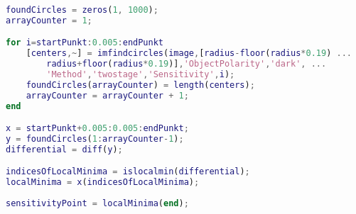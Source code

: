 \begin{lstlisting}[language=MATLAB, caption=Arbeitspunktsuche, label=lst:arbeitspunktsuche]
foundCircles = zeros(1, 1000);
arrayCounter = 1;

for i=startPunkt:0.005:endPunkt
	[centers,~] = imfindcircles(image,[radius-floor(radius*0.19) ...
		radius+floor(radius*0.19)],'ObjectPolarity','dark', ...
		'Method','twostage','Sensitivity',i);
	foundCircles(arrayCounter) = length(centers);
	arrayCounter = arrayCounter + 1;
end

x = startPunkt+0.005:0.005:endPunkt;
y = foundCircles(1:arrayCounter-1);
differential = diff(y);

indicesOfLocalMinima = islocalmin(differential);
localMinima = x(indicesOfLocalMinima);
	
sensitivityPoint = localMinima(end);
\end{lstlisting}